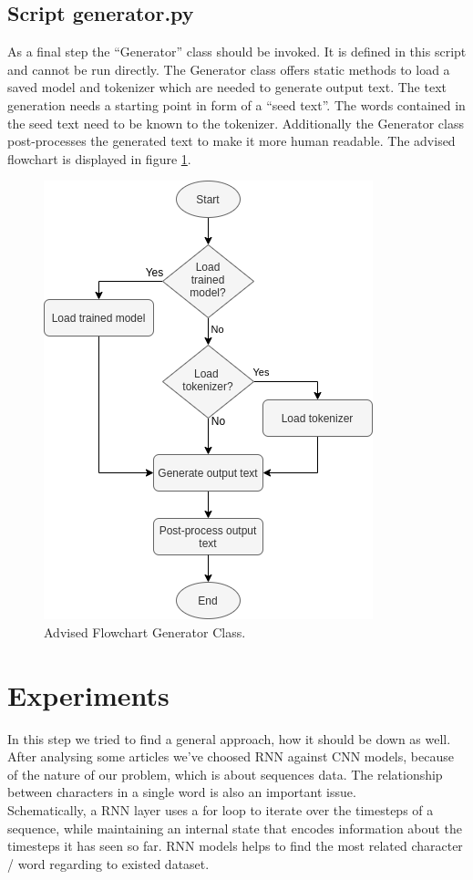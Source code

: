 \documentclass[conference]{IEEEtran}
\begin{document}
\subsection{Script generator.py}\label{subsec_generator}

As a final step the ``Generator'' class should be invoked. It is defined in this script and cannot be run directly. The Generator class offers static methods to load a saved model and tokenizer which are needed to generate output text. The text generation needs a starting point in form of a ``seed text''. The words contained in the seed text need to be known to the tokenizer. Additionally the Generator class post-processes the generated text to make it more human readable. The advised flowchart is displayed in figure \ref{fig:flowchart_generator}.

\begin{figure}[htbp]
\centerline{\includegraphics[scale=0.65]{pictures/flowchart_generator.png}}
\caption{Advised Flowchart Generator Class.}
\label{fig:flowchart_generator}
\end{figure}

\section{Experiments}

In this step we tried to find a general approach, how it should be down as well. After analysing some articles we’ve choosed RNN against CNN models, because of the nature of our problem, which is about sequences data. The relationship between characters in a single word is also an important issue.\\
Schematically, a RNN layer uses a for loop to iterate over the timesteps of a sequence, while maintaining an internal state that encodes information about the timesteps it has seen so far. RNN models helps to find the most related character / word regarding to existed dataset.
\end{document}
